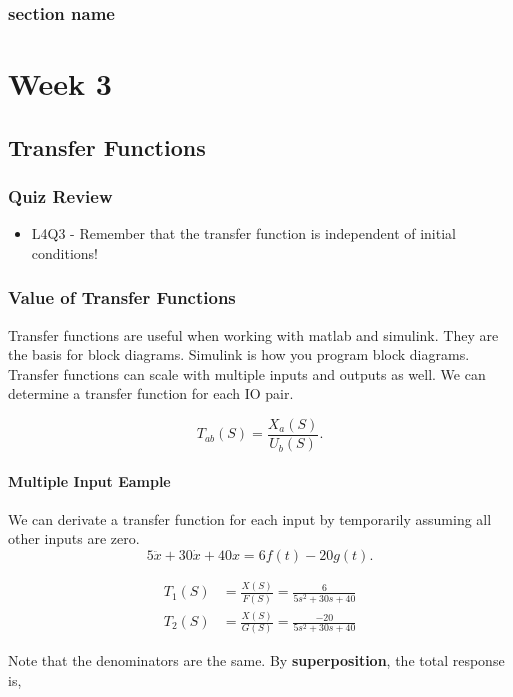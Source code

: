 \documentclass[12pt, a4paper]{report}
\begin{document}
  \section{section name}

  \part{Week 3}

  \chapter{Transfer Functions}

  \section{Quiz Review}
  \begin{itemize}
    \item L4Q3 - Remember that the transfer function is independent of initial conditions!
  \end{itemize}

  \section{Value of Transfer Functions}

  Transfer functions are useful when working with matlab and simulink. They are the basis for block diagrams. Simulink is how you program block diagrams. Transfer functions can scale with multiple inputs and outputs as well. We can determine a transfer function for each IO pair.

  \[
      T_{ab}(S) = \frac{X_a(S)}{U_b(S)}
    .\]

  \subsection{Multiple Input Eample}
  We can derivate a transfer function for each input by temporarily assuming all other inputs are zero.
  \[
      5 \ddot x + 30 \dot x + 40x = 6f(t) - 20g(t)
    .\]

  \begin{align*}
    T_1(S) &= \frac{X(S)}{F(S)} = \frac{6}{5s ^2 + 30s + 40} \\
    T_2(S) &= \frac{X(S)}{G(S)} = \frac{-20}{5s ^2 + 30s + 40}
  \end{align*}

  Note that the denominators are the same. By \textbf{superposition}, the total response is,
\end{document}
